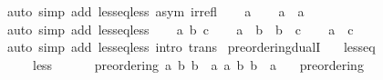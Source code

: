 \begin{isabellebody}
\ {\isacharparenleft}{\kern0pt}auto\ simp\ add{\isacharcolon}{\kern0pt}\ less{\isacharunderscore}{\kern0pt}eq{\isacharunderscore}{\kern0pt}less\ asym\ irrefl{\isacharparenright}{\kern0pt}\isanewline
{}\isamarkupfalse%
\isanewline
\ \ \isamarkupfalse%
\ a\isanewline
\ \ \isamarkupfalse%
\ {\isacartoucheopen}a\ \isactrlbold {\isasymle}\ a{\isacartoucheclose}\isanewline
\ \ \ \ \isamarkupfalse%
\ {\isacharparenleft}{\kern0pt}auto\ simp\ add{\isacharcolon}{\kern0pt}\ less{\isacharunderscore}{\kern0pt}eq{\isacharunderscore}{\kern0pt}less{\isacharparenright}{\kern0pt}\isanewline
{}\isamarkupfalse%
\isanewline
\ \ \isamarkupfalse%
\ a\ b\ c\isanewline
\ \ \isamarkupfalse%
\ {\isacartoucheopen}a\ \isactrlbold {\isasymle}\ b{\isacartoucheclose}\ \ {\isacartoucheopen}b\ \isactrlbold {\isasymle}\ c{\isacartoucheclose}\ \isamarkupfalse%
\ \isamarkupfalse%
\ {\isacartoucheopen}a\ \isactrlbold {\isasymle}\ c{\isacartoucheclose}\isanewline
\ \ \ \ \isamarkupfalse%
\ {\isacharparenleft}{\kern0pt}auto\ simp\ add{\isacharcolon}{\kern0pt}\ less{\isacharunderscore}{\kern0pt}eq{\isacharunderscore}{\kern0pt}less\ intro{\isacharcolon}{\kern0pt}\ trans{\isacharparenright}{\kern0pt}\isanewline
{}\isamarkupfalse%
%
\endisatagproof
{\isafoldproof}%
%
\isadelimproof
\isanewline
%
\endisadelimproof
\isanewline
{}\isamarkupfalse%
\ preordering{\isacharunderscore}{\kern0pt}dualI{\isacharcolon}{\kern0pt}\isanewline
\ \ \ less{\isacharunderscore}{\kern0pt}eq\ {\isacharparenleft}{\kern0pt}\ {\isacartoucheopen}\isactrlbold {\isasymle}{\isacartoucheclose}\ {}{}{\isacharparenright}{\kern0pt}\isanewline
\ \ \ \ \ less\ {\isacharparenleft}{\kern0pt}\ {\isacartoucheopen}\isactrlbold {\isacharless}{\kern0pt}{\isacartoucheclose}\ {}{}{\isacharparenright}{\kern0pt}\isanewline
\ \ \ {\isacartoucheopen}preordering\ {\isacharparenleft}{\kern0pt}{\isasymlambda}a\ b{\isachardot}{\kern0pt}\ b\ \isactrlbold {\isasymle}\ a{\isacharparenright}{\kern0pt}\ {\isacharparenleft}{\kern0pt}{\isasymlambda}a\ b{\isachardot}{\kern0pt}\ b\ \isactrlbold {\isacharless}{\kern0pt}\ a{\isacharparenright}{\kern0pt}{\isacartoucheclose}\isanewline
\ \ \ {\isacartoucheopen}preordering\ {\isacharparenleft}{\kern0pt}\isactrlbold {\isasymle}{\isacharparenright}{\kern0pt}\ {\isacharparenleft}{\kern0pt}\isactrlbold {\isacharless}{\kern0pt}{\isacharparenright}{\kern0pt}{\isacartoucheclose}\isanewline

\end{isabellebody}
